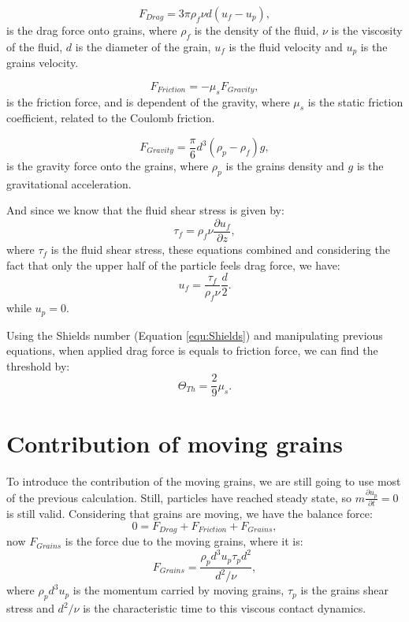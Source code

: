 \begin{equation}
    F_{Drag} = 3\pi \rho_f \nu d\left(u_f-u_p\right),
\end{equation}
is the drag force onto grains, where $\rho_f$ is the density of the fluid, $\nu$ is the viscosity of the fluid, $d$ is the diameter of the grain, $u_f$ is the fluid velocity and $u_p$ is the grains velocity.

\begin{equation}
    F_{Friction} = -\mu_s F_{Gravity},
\end{equation}
is the friction force, and is dependent of the gravity, where $\mu_s$ is the static friction coefficient, related to the Coulomb friction.

\begin{equation}
    F_{Gravity} = \frac{\pi}{6}d^3\left(\rho_p-\rho_f\right)g,
\end{equation}
is the gravity force onto the grains, where $\rho_p$ is the grains density and $g$ is the gravitational acceleration.

    And since we know that the fluid shear stress is given by:
\begin{equation}
    \tau_f = \rho_f \nu \frac{\partial u_f}{\partial z},
\end{equation}
where $\tau_f$ is the fluid shear stress, these equations combined and considering the fact that only the upper half of the particle feels drag force, we have:
\begin{equation}
    u_f = \frac{\tau_f}{\rho_f\nu}\frac{d}{2}.
\end{equation}
while $u_p = 0$.

    Using the Shields number (Equation \ref{equ:Shields}) and manipulating previous equations, when applied drag force is equals to friction force, we can find the threshold by:
\begin{equation}
    \Theta_{Th} = \frac{2}{9}\mu_s.
\end{equation} 

\section{Contribution of moving grains}
    To introduce the contribution of the moving grains, we are still going to use most of the previous calculation. Still, particles have reached steady state, so $m\frac{\partial u_p}{\partial t} = 0$ is still valid. Considering that grains are moving, we have the balance force:
\begin{equation}
    0 = F_{Drag} + F_{Friction} + F_{Grains},
\end{equation}
now $F_{Grains}$ is the force due to the moving grains, where it is:
\begin{equation}
    F_{Grains} = \frac{\rho_p d^3 u_p \tau_p d^2}{d^2/\nu},
\end{equation}
where $\rho_p d^3 u_p$ is the momentum carried by moving grains, $\tau_p$ is the grains shear stress and $d^2/\nu$ is the characteristic time to this viscous contact dynamics.

